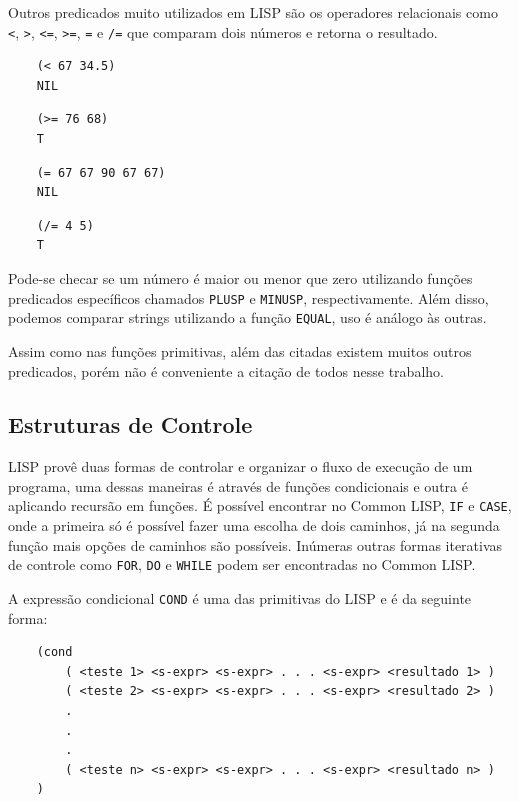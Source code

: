 \documentclass[a4paper, twoside, 12pt]{article}
\begin{document}
Outros predicados muito utilizados em LISP são os operadores relacionais como \texttt{<}, \texttt{>}, \texttt{<=}, \texttt{>=}, \texttt{=} e \texttt{/=} que comparam dois números e retorna o resultado.

\begin{verbatim}
    (< 67 34.5)
    NIL
\end{verbatim}

\begin{verbatim}
    (>= 76 68)
    T
\end{verbatim}

\begin{verbatim}
    (= 67 67 90 67 67)
    NIL
\end{verbatim}

\begin{verbatim}
    (/= 4 5)
    T
\end{verbatim}

Pode-se checar se um número é maior ou menor que zero utilizando funções predicados específicos chamados \texttt{PLUSP} e \texttt{MINUSP}, respectivamente. Além disso, podemos comparar strings utilizando a função \texttt{EQUAL}, uso é análogo às outras.

Assim como nas funções primitivas, além das citadas existem muitos outros predicados, porém não é conveniente a citação de todos nesse trabalho.

\subsection{Estruturas de Controle}

LISP provê duas formas de controlar e organizar o fluxo de execução de um programa, uma dessas maneiras é através de funções condicionais e outra é aplicando recursão em funções. É possível encontrar no Common LISP, \texttt{IF} e \texttt{CASE}, onde a primeira só é possível fazer uma escolha de dois caminhos, já na segunda função mais opções de caminhos são possíveis. Inúmeras outras formas iterativas de controle como \texttt{FOR}, \texttt{DO} e \texttt{WHILE} podem ser encontradas no Common LISP.

A expressão condicional \texttt{COND} é uma das primitivas do LISP e é da seguinte forma:

\begin{verbatim}
    (cond
        ( <teste 1> <s-expr> <s-expr> . . . <s-expr> <resultado 1> ) 
        ( <teste 2> <s-expr> <s-expr> . . . <s-expr> <resultado 2> ) 
        .
        .
        .
        ( <teste n> <s-expr> <s-expr> . . . <s-expr> <resultado n> ) 
    )
\end{verbatim}
\end{document}
